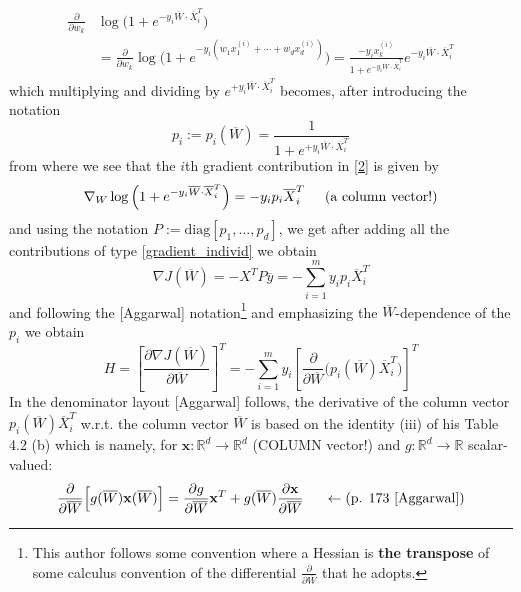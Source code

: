 \documentclass[12pt,a4paper]{article}
\begin{document}
\begin{align*}
\frac{\partial }{\partial w_k} &\log\Big( 1+e^{-y_i\overline{W}\cdot \overline{X}_i^T} \Big)\\
&=\frac{\partial }{\partial w_k} \log\Big( 1+e^{-y_i(w_1 x_1^{(i)}+\cdots +w_d x_d^{(i)})} \Big)=\frac{-y_i x_k^{(i)}}{1+e^{-y_i \overline{W}\cdot \overline{X}_i^T}}e^{-y_i \overline{W}\cdot \overline{X}_i^T}
\end{align*}
which multiplying and dividing by $e^{+y_i \overline{W}\cdot \overline{X}_i^T}$ becomes, after introducing the notation
\begin{equation}\label{p_i_def}
p_i:=p_i(\overline{W})=\frac{1}{1+e^{+y_i \overline{W}\cdot \overline{X}_i^T}}
\end{equation}
from where we see that the $i$th gradient contribution in \eqref{2} is given by
\begin{equation}\label{gradient_individ}
\nabla_W\log\Big( 1+e^{-y_i\overline{W}\cdot \overline{X}_i^T} \Big)=-y_ip_i\overline{X}_i^T\hspace{0.2in}\text{(a column vector!)}
\end{equation}
and using the notation $P:=\text{diag}[p_1,...,p_d]$, we get after adding all the contributions of type \eqref{gradient_individ} we obtain 
\begin{equation}
\nabla J(\overline{W})=-X^T P \overline{y}=-\sum_{i=1}^m y_i p_i \overline{X}_i^T
\end{equation}
and following the [Aggarwal] notation\footnote{This author follows some convention where a Hessian is \textbf{the transpose} of some calculus convention of the differential $\frac{\partial }{\partial \overline{W}}$ that he adopts. } and emphasizing the $\overline{W}$-dependence of the $p_i$ we obtain
\begin{equation}\label{aggarwal_5_17}
H=\left[ \frac{\partial \nabla J(\overline{W})}{\partial \overline{W}} \right]^T
=-\sum_{i=1}^m y_i  \left[ \frac{\partial }{\partial \overline{W}}\big(p_i(\overline{W}) \overline{X}_i^T \big)\right]^T
\end{equation}
In the denominator layout [Aggarwal] follows, the derivative of the column vector $p_i(\overline{W})\overline{X}_i^T$ w.r.t. the column vector $\overline{W}$ is based on the identity (iii) of his Table 4.2 (b) which is namely, for $\mathbf{x}:\mathbb{R}^d\rightarrow \mathbb{R}^d$ (COLUMN vector!) and $g:\mathbb{R}^d\rightarrow \mathbb{R}$ scalar-valued: 
\begin{equation}\label{identity_table_aggarwal}
\frac{\partial}{\partial \overline{W}}\Big[g(\overline{W})\mathbf{x}(\overline{W})\Big]=\frac{\partial g}{\partial \overline{W}}\mathbf{x}^T+g(\overline{W})\frac{\partial \mathbf{x}}{\partial \overline{W}} \hspace{0.2in}\leftarrow\text{(p. 173 [Aggarwal])}
\end{equation}
\end{document}
